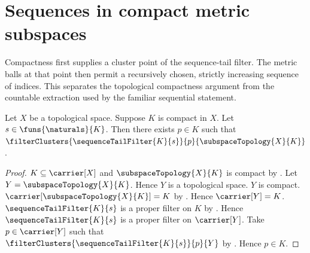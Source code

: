 \section{Sequences in compact metric subspaces}









Compactness first supplies a cluster point of the sequence-tail filter.  The
metric balls at that point then permit a recursively chosen, strictly
increasing sequence of indices.  This separates the topological compactness
argument from the countable extraction used by the familiar sequential
statement.

\begin{theorem}\label{compact_subspace_sequence_has_cluster_point}
    Let $X$ be a topological space.
    Suppose $K$ is compact in $X$.
    Let $s\in\funs{\naturals}{K}$.
    Then there exists $p\in K$ such that
        $\filterClusters{\sequenceTailFilter{K}{s}}{p}
            {\subspaceTopology{X}{K}}$.
\end{theorem}
\begin{proof}
    $K\subseteq\carrier[X]$ and
        $\subspaceTopology{X}{K}$ is compact by .
    Let $Y=\subspaceTopology{X}{K}$.
    Hence $Y$ is a topological space.
    $Y$ is compact.
    $\carrier[\subspaceTopology{X}{K}]=K$ by
        .
    Hence $\carrier[Y]=K$.
    $\sequenceTailFilter{K}{s}$ is a proper filter on $K$ by
        .
    Hence $\sequenceTailFilter{K}{s}$ is a proper filter on
        $\carrier[Y]$.
    Take $p\in\carrier[Y]$ such that
        $\filterClusters{\sequenceTailFilter{K}{s}}{p}{Y}$ by
        .
    Hence $p\in K$.
\end{proof}

